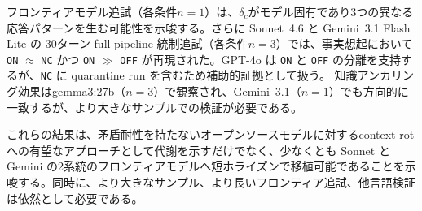 \documentclass[11pt,a4paper]{article}
\begin{document}
フロンティアモデル追試（各条件$n = 1$）は、$\delta_c$がモデル固有であり3つの異なる応答パターンを生む可能性を示唆する。さらに Sonnet~4.6 と Gemini~3.1 Flash Lite の 30ターン full-pipeline 統制追試（各条件$n = 3$）では、事実想起において \texttt{ON} $\approx$ \texttt{NC} かつ \texttt{ON} $\gg$ \texttt{OFF} が再現された。GPT-4o は \texttt{ON} と \texttt{OFF} の分離を支持するが、\texttt{NC} に quarantine run を含むため補助的証拠として扱う。
知識アンカリング効果はgemma3:27b（$n = 3$）で観察され、Gemini~3.1（$n = 1$）でも方向的に一致するが、より大きなサンプルでの検証が必要である。

これらの結果は、矛盾耐性を持たないオープンソースモデルに対するcontext rotへの有望なアプローチとして代謝を示すだけでなく、少なくとも Sonnet と Gemini の2系統のフロンティアモデルへ短ホライズンで移植可能であることを示唆する。同時に、より大きなサンプル、より長いフロンティア追試、他言語検証は依然として必要である。


\end{document}

